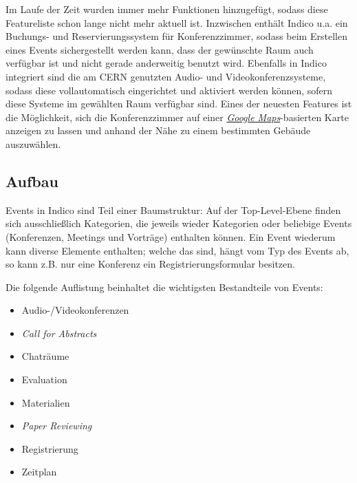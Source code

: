 Im Laufe der Zeit wurden immer mehr Funktionen hinzugefügt, sodass diese Featureliste schon lange
nicht mehr aktuell ist. Inzwischen enthält Indico u.a. ein Buchungs- und
Reservierungssystem für Konferenzzimmer, sodass beim Erstellen eines Events sichergestellt werden
kann, dass der gewünschte Raum auch verfügbar ist und nicht gerade anderweitig benutzt wird.
Ebenfalls in Indico integriert sind die am CERN genutzten Audio- und Videokonferenzsysteme, sodass diese
vollautomatisch eingerichtet und aktiviert werden können, sofern diese Systeme im gewählten Raum
verfügbar sind. Eines der neuesten Features ist die Möglichkeit, sich die Konferenzzimmer auf einer
\href{http://maps.google.com/}{\emph{Google Maps}}-basierten Karte anzeigen zu lassen und anhand der
Nähe zu einem bestimmten Gebäude auszuwählen.

\subsection{Aufbau}
Events in Indico sind Teil einer Baumstruktur: Auf der Top-Level-Ebene finden sich ausschließlich
Kategorien, die jeweils wieder Kategorien oder beliebige Events (Konferenzen, Meetings und
Vorträge) enthalten können. Ein Event wiederum kann diverse Elemente enthalten; welche das sind,
hängt vom Typ des Events ab, so kann z.B. nur eine Konferenz ein Registrierungsformular
besitzen.

\newpage
Die folgende Auflistung beinhaltet die wichtigsten Bestandteile von Events:
\begin{itemize}
\item Audio-/Videokonferenzen
\item \emph{Call for Abstracts}
\item Chaträume
\item Evaluation
\item Materialien
\item \emph{Paper Reviewing}
\item Registrierung
\item Zeitplan
\end{itemize}

